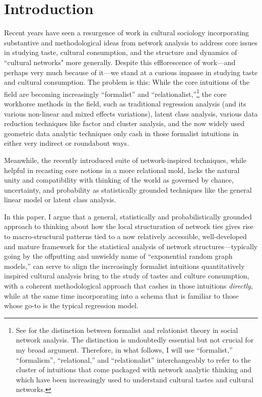 \documentclass[preprint,12pt,authoryear]{elsarticle}
\begin{document}

\section{Introduction}
\label{sec:intro}
Recent years have seen a resurgence of work in cultural sociology incorporating substantive and methodological ideas from network analysis to address core issues in studying taste, cultural consumption, and the structure and dynamics of ``cultural networks" more generally. Despite this efflorescence of work---and perhaps very much because of it---we stand at a curious impasse in studying taste and cultural consumption. The problem is this: While the core intuitions of the field are becoming increasingly ``formalist'' and ``relationalist,''\footnote{See \citet{erikson2013formalist} for the distinction between formalist and relationist theory in social network analysis. The distinction is undoubtedly essential but not crucial for my broad argument. Therefore, in what follows, I will use ``formalist,'' ``formalism'', ``relational,'' and ``relationalist'' interchangeably to refer to the cluster of intuitions that come packaged with network analytic thinking and which have been increasingly used to understand cultural tastes and cultural networks.} the core workhorse methods in the field, such as traditional regression analysis (and its various non-linear and mixed effects variations), latent class analysis, various data reduction techniques like factor and cluster analysis, and the now widely used geometric data analytic techniques only cash in those formalist intuitions in either very indirect or roundabout ways. 

Meanwhile, the recently introduced suite of network-inspired techniques, while helpful in recasting core notions in a more relational mold, lacks the natural unity and compatibility with thinking of the world as governed by chance, uncertainty, and probability as statistically grounded techniques like the general linear model or latent class analysis. 

In this paper, I argue that a general, statistically and probabilistically grounded approach to thinking about how the local structuration of network ties gives rise to macro-structural patterns tied to a now relatively accessible, well-developed and mature framework for the statistical analysis of network structures---typically going by the offputting and unwieldy name of ``exponential random graph models,'' can serve to align the increasingly formalist intuitions quantitatively inspired cultural analysis bring to the study of tastes and culture consumption, with a coherent methodological approach that cashes in those intuitions \textit{directly}, while at the same time incorporating into a schema that is familiar to those whose go-to is the typical regression model. 
\end{document}
